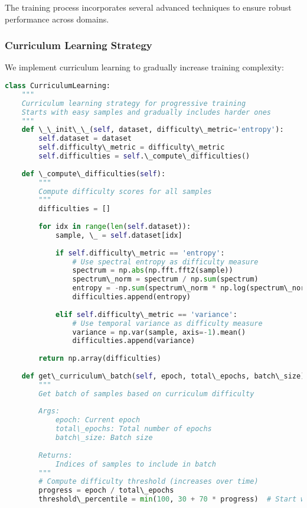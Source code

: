\documentclass[journal]{IEEEtran}
\begin{document}
The training process incorporates several advanced techniques to ensure robust performance across domains.

\subsubsection{Curriculum Learning Strategy}

We implement curriculum learning to gradually increase training complexity:

\begin{lstlisting}[language=Python, caption=Curriculum Learning Implementation]
class CurriculumLearning:
    """
    Curriculum learning strategy for progressive training
    Starts with easy samples and gradually includes harder ones
    """
    def \_\_init\_\_(self, dataset, difficulty\_metric='entropy'):
        self.dataset = dataset
        self.difficulty\_metric = difficulty\_metric
        self.difficulties = self.\_compute\_difficulties()
        
    def \_compute\_difficulties(self):
        """
        Compute difficulty scores for all samples
        """
        difficulties = []
        
        for idx in range(len(self.dataset)):
            sample, \_ = self.dataset[idx]
            
            if self.difficulty\_metric == 'entropy':
                # Use spectral entropy as difficulty measure
                spectrum = np.abs(np.fft.fft2(sample))
                spectrum\_norm = spectrum / np.sum(spectrum)
                entropy = -np.sum(spectrum\_norm * np.log(spectrum\_norm + 1e-10))
                difficulties.append(entropy)
                
            elif self.difficulty\_metric == 'variance':
                # Use temporal variance as difficulty measure
                variance = np.var(sample, axis=-1).mean()
                difficulties.append(variance)
                
        return np.array(difficulties)
    
    def get\_curriculum\_batch(self, epoch, total\_epochs, batch\_size):
        """
        Get batch of samples based on curriculum difficulty
        
        Args:
            epoch: Current epoch
            total\_epochs: Total number of epochs
            batch\_size: Batch size
        
        Returns:
            Indices of samples to include in batch
        """
        # Compute difficulty threshold (increases over time)
        progress = epoch / total\_epochs
        threshold\_percentile = min(100, 30 + 70 * progress)  # Start with easiest 30%
        

\end{lstlisting}
\end{document}
